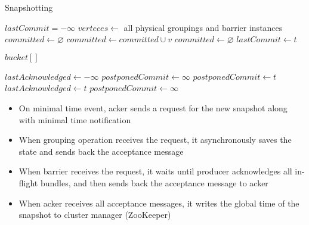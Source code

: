 \begin{algorithm}
\caption{Snapshotting}
\label{consumer-contract}
  \begin{algorithmic}
      \State $lastCommit = -\infty$ 
      \State $verteces \gets$ all physical groupings and barrier instances
      \State $committed \gets \varnothing$
      \State
         
            \State {}
          \EndFor
        \EndIf
      \EndEvent
        \State $committed \gets committed \cup v$
          \State $committed \gets \varnothing$
          \State $lastCommit \gets t$
        \EndIf
      \EndEvent
    \EndProcess

      \State $bucket[]$ 
      \State
        \State {} 
        \State {}
        \State {}
      \EndEvent
    \EndProcess

      \State $lastAcknowledged \gets -\infty$ 
      \State $postponedCommit \gets \infty$
      \State
          \State {}
        \Else
          \State $postponedCommit \gets t$
        \EndIf
      \EndEvent
        \State $lastAcknowledged \gets t$
          \State {}
          \State $postponedCommit \gets \infty$
        \EndIf
      \EndEvent
    \EndProcess
  \end{algorithmic}
\end{algorithm}

\begin{itemize}
    \item On minimal time event, acker sends a request for the new snapshot along with minimal time notification
    \item When grouping operation receives the request, it asynchronously saves the state and sends back the acceptance message   
    \item When barrier receives the request, it waits until producer acknowledges all in-flight bundles, and then sends back the acceptance message to acker
    \item When acker receives all acceptance messages, it writes the global time of the snapshot to cluster manager (ZooKeeper) 
\end{itemize}

